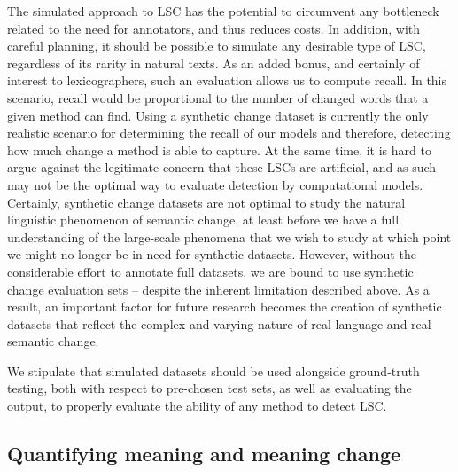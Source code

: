 \documentclass[output=paper]{langscibook}
\begin{document}
 The simulated approach to LSC has the potential to circumvent any bottleneck related to the need for annotators, and thus reduces costs. 
 In addition, with careful planning, it should be possible to simulate any desirable type of LSC, regardless of its rarity in natural texts. As an added bonus, and certainly of interest to lexicographers, such an evaluation allows us to compute recall. In this scenario, recall would be proportional to the number of changed words that a given method can find. 
   Using a synthetic change dataset is currently  the only realistic scenario for determining the recall of our models and therefore, detecting how much change a method is able to capture. At the same time, it is hard to argue against the legitimate concern that these LSCs are artificial, and as such may not be the optimal way to evaluate detection by computational models. Certainly, synthetic change datasets are not optimal to study the natural linguistic phenomenon of semantic change, at least before we have a full understanding of the large-scale phenomena that we wish to study at which point we might no longer be in need for synthetic datasets.  
   However, without the considerable effort to annotate full datasets, we are bound to use synthetic change evaluation sets -- despite the inherent limitation described above. 
  As a result, an important factor for future research becomes the creation of synthetic datasets  that  reflect the complex and varying nature of real language and real semantic change. 
  
  We stipulate that simulated datasets should be used alongside ground-truth testing, both with respect to pre-chosen test sets, as well as evaluating the output, to properly evaluate the ability of any method to detect LSC. 
 
 
\subsection{Quantifying meaning and meaning change}
\end{document}
